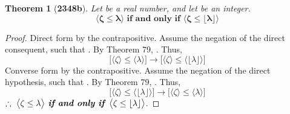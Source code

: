 \documentclass[preview]{standalone}
\newtheorem{theorem}{Theorem}
\begin{document}
\begin{theorem}[\textbf{2348b}]
    Let \bm{$\lambda$} be a real number, 
    and let \bm{$\zeta$} be an integer. 
    \begin{equation*}
        \bm{
        \big \langle \zeta \le \lambda \big \rangle
            \textbf{ if and only if }
        \big \langle \zeta \le \lfloor \lambda \rfloor \big \rangle}
    \end{equation*}
\end{theorem}

\begin{proof}
    Direct form by the contrapositive.
    Assume the negation of the direct consequent,
    such that \bm{$\zeta > \lfloor \lambda \rfloor$}.
    By Theorem 79, \bm{$\zeta > \lambda$}.
    Thus,
    \begin{equation*}
        \bigg[
            \Big \langle \zeta \Big \rangle
                \leq 
            \Big \langle \lambda \Big \rangle
        \bigg]
            \rightarrow 
        \bigg[
            \Big \langle \zeta \Big \rangle
                \leq 
            \Big \langle \lfloor \lambda \rfloor \Big \rangle
        \bigg]
    \end{equation*}
    Converse form by the contrapositive.
    Assume the negation of the direct hypothesis,
    such that \bm{$\zeta > \lambda$}.
    By Theorem 79, 
    \bm{$\zeta > \lfloor \lambda \rfloor$}.
    Thus,
    \begin{equation*}
        \bigg[
            \Big \langle \zeta \Big \rangle
                \leq 
            \Big \langle \lfloor \lambda \rfloor \Big \rangle
        \bigg]
            \rightarrow 
        \bigg[
            \Big \langle \zeta \Big \rangle
                \leq 
            \Big \langle \lambda \Big \rangle
        \bigg]
    \end{equation*}
    $\therefore \text{\space} \relax{
        \big \langle \zeta \le \lambda \big \rangle
            \textbf{ \emph{if and only if} }
        \big \langle \zeta \le \lfloor \lambda \rfloor \big \rangle}
    $.
\end{proof}
\end{document}
